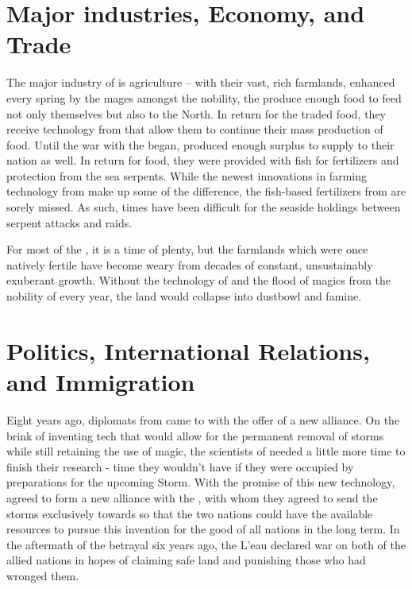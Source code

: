 \documentclass[blue]{GL2020}
\begin{document}

\section*{Major industries, Economy, and Trade}

The major industry of \pFarm{} is agriculture -- with their vast, rich farmlands, enhanced every spring by the mages amongst the nobility, the \pFarmers{} produce enough food to feed not only themselves but also \pTech{} to the North.  In return for the traded food, they receive technology from \pTech{} that allow them to continue their mass production of food.  Until the war with the \pShippies{} began, \pFarm{} produced enough surplus to supply to their nation as well.  In return for food, they were provided with fish for fertilizers and protection from the sea serpents.  While the newest innovations in farming technology from \pTech{} make up some of the difference, the fish-based fertilizers from \pShip{} are sorely missed. As such, times have been difficult for the seaside holdings between serpent attacks and \pShip{} raids.

For most of the \pFarmers{}, it is a time of plenty, but the farmlands which were once natively fertile have become weary from decades of constant, unsustainably exuberant growth.  Without the technology of \pTech{} and the flood of magics from the nobility of \pFarm{} every year, the land would collapse into dustbowl and famine.

\section*{Politics, International Relations, and Immigration}

Eight years ago, diplomats from \pTech{} came to \pFarm{} with the offer of a new alliance.  On the brink of inventing tech that would allow for the permanent removal of storms while still retaining the use of magic, the scientists of \pTech{} needed a little more time to finish their research - time they wouldn’t have if they were occupied by preparations for the upcoming Storm.  With the promise of this new technology, \cQueen{} agreed to form a new alliance with the \pTech{}, with whom they agreed to send the storms exclusively towards \pShip{} so that the two nations could have the available resources to pursue this invention for the good of all nations in the long term.  In the aftermath of the betrayal six years ago, the L'eau declared war on both of the allied nations in hopes of claiming safe land and punishing those who had wronged them.  
\end{document}
